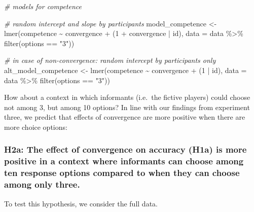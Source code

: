 \documentclass[
]{article}
\newenvironment{Shaded}{\begin{snugshade}}{\end{snugshade}}
\newcommand{\AttributeTok}[1]{\textcolor[rgb]{0.77,0.63,0.00}{#1}}
\newcommand{\CommentTok}[1]{\textcolor[rgb]{0.56,0.35,0.01}{\textit{#1}}}
\newcommand{\DecValTok}[1]{\textcolor[rgb]{0.00,0.00,0.81}{#1}}
\newcommand{\FunctionTok}[1]{\textcolor[rgb]{0.00,0.00,0.00}{#1}}
\newcommand{\NormalTok}[1]{#1}
\newcommand{\OtherTok}[1]{\textcolor[rgb]{0.56,0.35,0.01}{#1}}
\newcommand{\SpecialCharTok}[1]{\textcolor[rgb]{0.00,0.00,0.00}{#1}}
\newcommand{\StringTok}[1]{\textcolor[rgb]{0.31,0.60,0.02}{#1}}
\begin{document}
\begin{Shaded}
\begin{Highlighting}[]
\CommentTok{\# models for competence}

\CommentTok{\# random intercept and slope by participants}
\NormalTok{model\_competence }\OtherTok{\textless{}{-}} \FunctionTok{lmer}\NormalTok{(competence }\SpecialCharTok{\textasciitilde{}}\NormalTok{ convergence }\SpecialCharTok{+} 
\NormalTok{                           (}\DecValTok{1} \SpecialCharTok{+}\NormalTok{ convergence }\SpecialCharTok{|}\NormalTok{ id), }
                         \AttributeTok{data =}\NormalTok{ data }\SpecialCharTok{\%\textgreater{}\%} \FunctionTok{filter}\NormalTok{(options }\SpecialCharTok{==} \StringTok{"3"}\NormalTok{))}

\CommentTok{\# in case of non{-}convergence: random intercept by participants only}
\NormalTok{alt\_model\_competence }\OtherTok{\textless{}{-}} \FunctionTok{lmer}\NormalTok{(competence }\SpecialCharTok{\textasciitilde{}}\NormalTok{ convergence }\SpecialCharTok{+}\NormalTok{ (}\DecValTok{1} \SpecialCharTok{|}\NormalTok{ id), }
                             \AttributeTok{data =}\NormalTok{ data }\SpecialCharTok{\%\textgreater{}\%} \FunctionTok{filter}\NormalTok{(options }\SpecialCharTok{==} \StringTok{"3"}\NormalTok{))}
\end{Highlighting}
\end{Shaded}

How about a context in which informants (i.e.~the fictive players) could
choose not among 3, but among 10 options? In line with our findings from
experiment three, we predict that effects of convergence are more
positive when there are more choice options:

\hypertarget{h2a-the-effect-of-convergence-on-accuracy-h1a-is-more-positive-in-a-context-where-informants-can-choose-among-ten-response-options-compared-to-when-they-can-choose-among-only-three.}{%
\subsubsection{H2a: The effect of convergence on accuracy (H1a) is more
positive in a context where informants can choose among ten response
options compared to when they can choose among only
three.}\label{h2a-the-effect-of-convergence-on-accuracy-h1a-is-more-positive-in-a-context-where-informants-can-choose-among-ten-response-options-compared-to-when-they-can-choose-among-only-three.}}

To test this hypothesis, we consider the full data.
\end{document}
